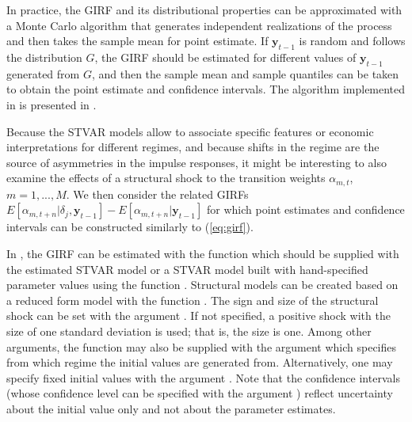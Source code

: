 \documentclass[nojss]{jss}
\begin{document}
In practice, the GIRF and its distributional properties can be approximated with a Monte Carlo algorithm that generates independent realizations of the process and then takes the sample mean for point estimate. If $\boldsymbol{y}_{t-1}$ is random and follows the distribution $G$, the GIRF should be estimated for different values of $\boldsymbol{y}_{t-1}$ generated from $G$, and then the sample mean and sample quantiles can be taken to obtain the point estimate and confidence intervals. The algorithm implemented in  is presented in \cite{Lanne+Virolainen:2024}.

Because the STVAR models allow to associate specific features or economic interpretations for different regimes, and because shifts in the regime are the source of asymmetries in the impulse responses, it might be interesting to also examine the effects of a structural shock to the transition weights $\alpha_{m,t}$, $m=1,...,M$. We then consider the related GIRFs $E[\alpha_{m,t+n}|\delta_j,\boldsymbol{y}_{t-1}] - E[\alpha_{m,t+n}|\boldsymbol{y}_{t-1}]$ for which point estimates and confidence intervals can be constructed similarly to (\ref{eq:girf}).

In , the GIRF can be estimated with the function  which should be supplied with the estimated STVAR model or a STVAR model built with hand-specified parameter values using the function . Structural models can be created based on a reduced form model with the function . The sign and size of the structural shock can be set with the argument . If not specified, a positive shock with the size of one standard deviation is used; that is, the size is one. Among other arguments, the function may also be supplied with the argument  which specifies from which regime the initial values are generated from. Alternatively, one may specify fixed initial values with the argument . Note that the confidence intervals (whose confidence level can be specified with the argument ) reflect uncertainty about the initial value only and not about the parameter estimates.
\end{document}
